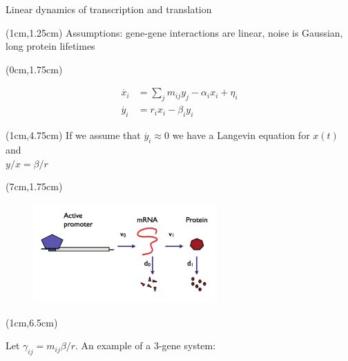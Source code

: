 \documentclass[aspectratio=1610]{beamer}					%
\begin{document}
\begin{frame}{Linear dynamics of transcription and translation}

\begin{textblock*}{15cm}(1cm,1.25cm)
Assumptions: gene-gene interactions are linear, noise is Gaussian, long protein lifetimes
\end{textblock*}

\begin{textblock*}{7cm}(0cm,1.75cm)
\begin{figure}
\begin{align*}
\dot{x_{i}} &= \sum_{j}m_{ij}y_{j} - \alpha_{i}x_{i} + \eta_{i}\\
\dot{y_{i}} &= r_{i}x_{i} - \beta_{i}y_{i}
\end{align*}
\end{figure}
\end{textblock*}

\begin{textblock*}{7cm}(1cm,4.75cm)
If we assume that $\dot{y_{i}} \approx 0$ we have a Langevin equation for $x(t)$ and \\$y/x = \beta/r$
\end{textblock*}

\begin{textblock*}{7cm}(7cm,1.75cm)
\begin{figure}
\includegraphics[width=7cm]{linear.png}
\end{figure}
\end{textblock*}

\begin{textblock*}{15cm}(1cm,6.5cm)

Let $\gamma_{ij} = m_{ij}\beta/r$. An example of a 3-gene system:


\end{textblock*}
\end{frame}
\end{document}
